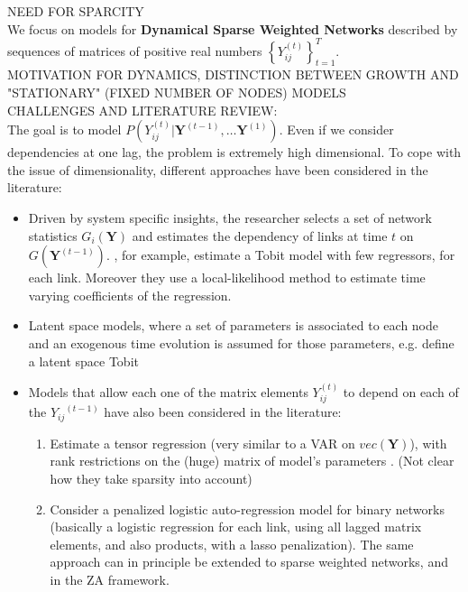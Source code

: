 \documentclass[a4paper,12pt]{article}
\newcommand{\tonde}[1]{\left(#1\right)}
\newcommand{\pt}[1]{\left(#1\right)}
\newcommand{\pg}[1]{\left\lbrace#1\right\rbrace}
\newcommand{\Y}{{\mathbf{Y}}}
\newcommand{\Ytm}{{\mathbf{Y}^{\tonde{t-1}}}}
\newcommand{\Yijt}{{Y_{ij}^{\tonde{t}}}}
\newcommand{\Yij}{{Y_{ij}}}
\newcommand{\etm}{^{\tonde{t-1}}}
\newcommand{\e}[1]{^{\tonde{#1}}}
\begin{document}
NEED FOR SPARCITY\\

We focus on models for  \textbf{Dynamical Sparse Weighted Networks} described by sequences of matrices of positive real numbers $\pg{\Yijt}_{t=1}^{T}$.\\

MOTIVATION FOR DYNAMICS, DISTINCTION BETWEEN GROWTH AND "STATIONARY" (FIXED NUMBER OF NODES) MODELS\\

CHALLENGES AND LITERATURE REVIEW: \\
The goal is to model $P\pt{\Yijt\vert \Y\e{t-1},\dots \Y\e{1}}$. Even if we consider dependencies at one lag, the problem is extremely high dimensional. To cope with the issue of dimensionality, different approaches have been considered in the literature:
\begin{itemize}
	\item  Driven by system specific insights, the researcher selects a set of network statistics $G_i\pt{\Y}$ and estimates the dependency of links at time $t$ on $G\pt{\Ytm}$. \cite{giraitis2016estimating}, for example, estimate a Tobit model with few regressors, for each link. Moreover they use a local-likelihood method to estimate time varying coefficients of the regression. 
	\item Latent space models, where a set of parameters is associated to each node and an exogenous time evolution is assumed for those parameters, e.g.  \cite{sewell2015latent} define a latent space Tobit 
	\item Models that allow each one of the matrix elements $\Yijt$ to depend on each of the $\Yij\etm$ have also been considered in the literature:
	\begin{enumerate}
		\item \cite{billio2018bayesian} Estimate a tensor regression (very similar to a VAR on $vec(\Y)$), with rank restrictions on the (huge) matrix of model's parameters . (Not clear how they take sparsity into account)
		\item \cite{doi:10.1080/02664763.2017.1357684} Consider a penalized logistic auto-regression model for binary networks (basically a logistic regression for each link, using all lagged matrix elements, and also products, with a lasso penalization). The same approach can in principle be extended to sparse weighted networks, and in the ZA framework.
	\end{enumerate}
\end{itemize}
\end{document}
